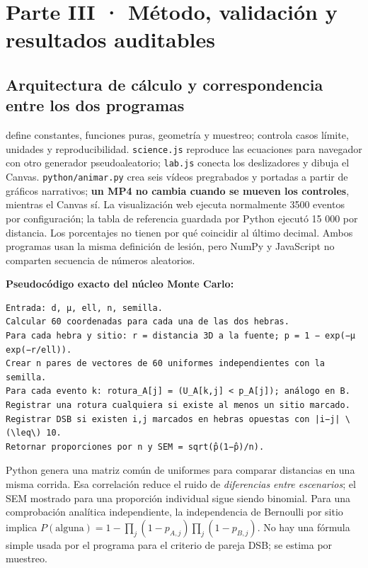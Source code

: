 \documentclass[11pt,a4paper,oneside]{article}
\begin{document}
\section{Parte III · Método, validación y resultados auditables}\label{parte-iii-muxe9todo-validaciuxf3n-y-resultados-auditables}

\subsection{Arquitectura de cálculo y correspondencia entre los dos programas}\label{arquitectura-de-cuxe1lculo-y-correspondencia-entre-los-dos-programas}

 define constantes, funciones puras, geometría y muestreo;  controla casos límite, unidades y reproducibilidad. \texttt{science.js} reproduce las ecuaciones para navegador con otro generador pseudoaleatorio; \texttt{lab.js} conecta los deslizadores y dibuja el Canvas. \texttt{python/animar.py} crea seis vídeos pregrabados y portadas a partir de gráficos narrativos; \textbf{un MP4 no cambia cuando se mueven los controles}, mientras el Canvas sí. La visualización web ejecuta normalmente 3500 eventos por configuración; la tabla de referencia guardada por Python ejecutó 15 000 por distancia. Los porcentajes no tienen por qué coincidir al último decimal. Ambos programas usan la misma definición de lesión, pero NumPy y JavaScript no comparten secuencia de números aleatorios.

\textbf{Pseudocódigo exacto del núcleo Monte Carlo:}

\begin{verbatim}
Entrada: d, μ, ell, n, semilla.
Calcular 60 coordenadas para cada una de las dos hebras.
Para cada hebra y sitio: r = distancia 3D a la fuente; p = 1 − exp(−μ exp(−r/ell)).
Crear n pares de vectores de 60 uniformes independientes con la semilla.
Para cada evento k: rotura_A[j] = (U_A[k,j] < p_A[j]); análogo en B.
Registrar una rotura cualquiera si existe al menos un sitio marcado.
Registrar DSB si existen i,j marcados en hebras opuestas con |i−j| \(\leq\) 10.
Retornar proporciones por n y SEM = sqrt(p̂(1−p̂)/n).
\end{verbatim}

Python genera una matriz común de uniformes para comparar distancias en una misma corrida. Esa correlación reduce el ruido de \emph{diferencias entre escenarios}; el SEM mostrado para una proporción individual sigue siendo binomial. Para una comprobación analítica independiente, la independencia de Bernoulli por sitio implica \(P(\text{alguna})=1-\prod_j(1-p_{A,j})\prod_j(1-p_{B,j})\). No hay una fórmula simple usada por el programa para el criterio de pareja DSB; se estima por muestreo.
\end{document}
